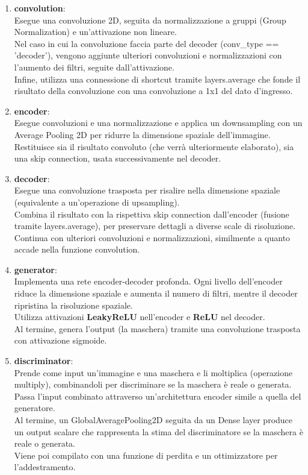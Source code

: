 \documentclass[12pt,a4paper,openright,twoside]{book}
\begin{document}
\begin{enumerate}
\item \textbf{convolution}:\\
Esegue una convoluzione 2D, seguita da normalizzazione a gruppi (Group Normalization) e un'attivazione non lineare.\\
Nel caso in cui la convoluzione faccia parte del decoder (conv\_type == 'decoder'), vengono aggiunte ulteriori convoluzioni e normalizzazioni con l'aumento dei filtri, seguite dall'attivazione.\\
Infine, utilizza una connessione di shortcut tramite layers.average che fonde il risultato della convoluzione con una convoluzione a 1x1 del dato d'ingresso.

\item \textbf{encoder}:\\
Esegue convoluzioni e una normalizzazione e applica un downsampling con un Average Pooling 2D per ridurre la dimensione spaziale dell'immagine.\\
Restituisce sia il risultato convoluto (che verrà ulteriormente elaborato), sia una skip connection, usata successivamente nel decoder.

\item \textbf{decoder}:\\
Esegue una convoluzione trasposta per risalire nella dimensione spaziale (equivalente a un'operazione di upsampling).\\
Combina il risultato con la rispettiva skip connection dall'encoder (fusione tramite layers.average), per preservare dettagli a diverse scale di risoluzione.\\
Continua con ulteriori convoluzioni e normalizzazioni, similmente a quanto accade nella funzione convolution.

\item \textbf{generator}:\\
Implementa una rete encoder-decoder profonda. Ogni livello dell'encoder riduce la dimensione spaziale e aumenta il numero di filtri, mentre il decoder ripristina la risoluzione spaziale.\\
Utilizza attivazioni \textbf{LeakyReLU} nell'encoder e \textbf{ReLU} nel decoder.\\
Al termine, genera l'output (la maschera) tramite una convoluzione trasposta con attivazione sigmoide.

\item \textbf{discriminator}:\\
Prende come input un'immagine e una maschera e li moltiplica (operazione multiply), combinandoli per discriminare se la maschera è reale o generata.\\
Passa l'input combinato attraverso un'architettura encoder simile a quella del generatore.\\
Al termine, un GlobalAveragePooling2D seguita da un Dense layer produce un output scalare che rappresenta la stima del discriminatore se la maschera è reale o generata.\\
Viene poi compilato con una funzione di perdita e un ottimizzatore per l'addestramento.


\end{enumerate}
\end{document}
